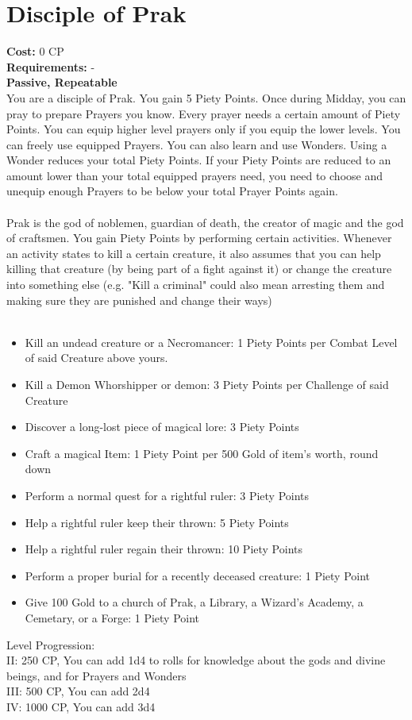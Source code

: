 \section{Disciple of Prak}
\textbf{Cost:} 0 CP\\
\textbf{Requirements:} - \\
\textbf{Passive, Repeatable}\\
You are a disciple of Prak. You gain 5 Piety Points. Once during Midday, you can pray to prepare Prayers you know. Every prayer needs a certain amount of Piety Points. You can equip higher level prayers only if you equip the lower levels. You can freely use equipped Prayers. You can also learn and use Wonders. Using a Wonder reduces your total Piety Points. If your Piety Points are reduced to an amount lower than your total equipped prayers need, you need to choose and unequip enough Prayers to be below your total Prayer Points again.\\
\\
Prak is the god of noblemen, guardian of death, the creator of magic and the god of craftsmen. You gain Piety Points by performing certain activities. Whenever an activity states to kill a certain creature, it also assumes that you can help killing that creature (by being part of a fight against it) or change the creature into something else (e.g. "Kill a criminal" could also mean arresting them and making sure they are punished and change their ways)\\
\\
\begin{itemize}
	\item Kill an undead creature or a Necromancer: 1 Piety Points  per Combat Level of said Creature above yours.
	\item Kill a Demon Whorshipper or demon: 3 Piety Points per Challenge of said Creature
	\item Discover a long-lost piece of magical lore: 3 Piety Points
	\item Craft a magical Item: 1 Piety Point per 500 Gold of item's worth, round down
	\item Perform a normal quest for a rightful ruler: 3 Piety Points
	\item Help a rightful ruler keep their thrown: 5 Piety Points
	\item Help a rightful ruler regain their thrown: 10 Piety Points
	\item Perform a proper burial for a recently deceased creature: 1 Piety Point
	\item Give 100 Gold to a church of Prak, a Library, a Wizard's Academy, a Cemetary, or a Forge: 1 Piety Point
\end{itemize}

Level Progression:\\
II: 250 CP, You can add 1d4 to rolls for knowledge about the gods and divine beings, and for Prayers and Wonders\\
III: 500 CP, You can add 2d4\\
IV: 1000 CP, You can add 3d4\\